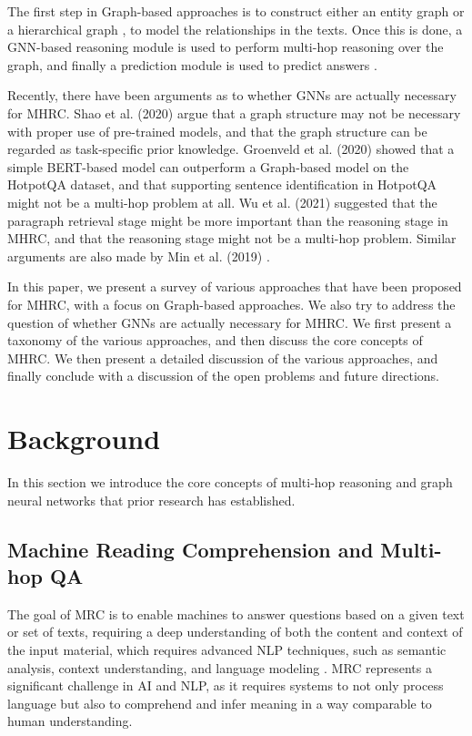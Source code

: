 \documentclass[sigplan,screen,nonacm]{acmart}
\begin{document}

The first step in Graph-based approaches is to construct either an entity graph \cite{RN81} \cite{RN117} \cite{RN122} \cite{RN141} \cite{RN91}
 \cite{RN130} or a hierarchical graph \cite{RN124} \cite{RN119} \cite{RN130}, to model the relationships in the texts. Once this is done, a 
GNN-based reasoning module is used to perform multi-hop reasoning over the graph, and finally a prediction module is used to predict answers 
\cite{RN23}.

Recently, there have been arguments as to whether GNNs are actually necessary for MHRC. Shao et al. (2020) \cite{RN127} argue that 
a graph structure may not be necessary with proper use of pre-trained models, and that the graph structure can be regarded as task-specific 
prior knowledge. Groenveld et al. (2020) \cite{RN126} showed that a simple BERT-based model can outperform a Graph-based model on the HotpotQA 
dataset, and that supporting sentence identification in HotpotQA might not be a multi-hop problem at all. Wu et al. (2021) \cite{RN106} 
suggested that the paragraph retrieval stage might be more important than the reasoning stage in MHRC, and that the reasoning stage might not 
be a multi-hop problem. Similar arguments are also made by Min et al. (2019) \cite{RN150}.

In this paper, we present a survey of various approaches that have been proposed for MHRC, with a focus on Graph-based approaches. We also 
try to address the question of whether GNNs are actually necessary for MHRC. We first present a taxonomy of the various approaches, and then 
discuss the core concepts of MHRC. We then present a detailed discussion of the various approaches, and finally conclude with a discussion of 
the open problems and future directions.

\section{Background}
In this section we introduce the core concepts of multi-hop reasoning and graph neural networks that prior research has established.  

\subsection{Machine Reading Comprehension and Multi-hop QA}
The goal of MRC is to enable machines to answer questions based on a given text or set of texts, requiring a deep understanding of both the 
content and context of the input material, which requires advanced NLP techniques, such as semantic analysis, context understanding, and 
language modeling \cite{RN208}. MRC represents a significant challenge in AI and NLP, as it requires systems to not only process language 
but also to comprehend and infer meaning in a way comparable to human understanding.
\end{document}
